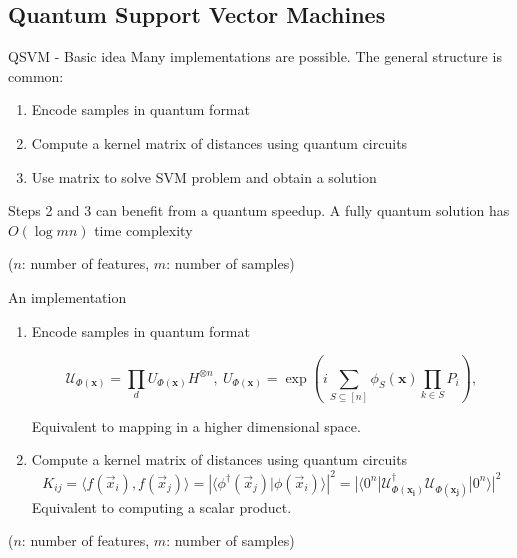 \subsection{Quantum Support Vector Machines}


\begin{frame}{QSVM - Basic idea}
    Many implementations are possible. The general structure is common:
    \begin{enumerate}
        \item Encode samples in quantum format
        \item Compute a kernel matrix of distances using quantum circuits
        \item Use matrix to solve SVM problem and obtain a solution
    \end{enumerate}
    Steps 2 and 3 can benefit from a quantum speedup. A fully quantum solution has $O(\log mn)$ time complexity 
    
    ($n$: number of features, $m$: number of samples)
\end{frame}

\begin{frame}{An implementation}
    \begin{enumerate}
        \item Encode samples in quantum format
        
        $$ \mathcal{U}_{\Phi(\mathbf{x})}=\prod_d U_{\Phi(\mathbf{x})}H^{\otimes n},\ U_{\Phi(\mathbf{x})}=\exp\left(i\sum_{S\subseteq[n]}\phi_S(\mathbf{x})\prod_{k\in S} P_i\right), $$
        
        Equivalent to mapping in a higher dimensional space.
        \vspace{0.5mm}
        \item Compute a kernel matrix of distances using quantum circuits
        $$K_{ij} = \langle f(\vec{x}_i), f(\vec{x}_j) \rangle = \left| \langle \phi^\dagger(\vec{x}_j)| \phi(\vec{x}_i) \rangle \right|^{2} = 
        |\langle 0^n |\mathcal{U}_{\Phi(\mathbf{x_i})}^{\dagger}\mathcal{U}_{\Phi(\mathbf{x_j})}| 0^n \rangle |^2
        $$
        Equivalent to computing a scalar product.
    \end{enumerate}
    
    ($n$: number of features, $m$: number of samples)
\end{frame}

